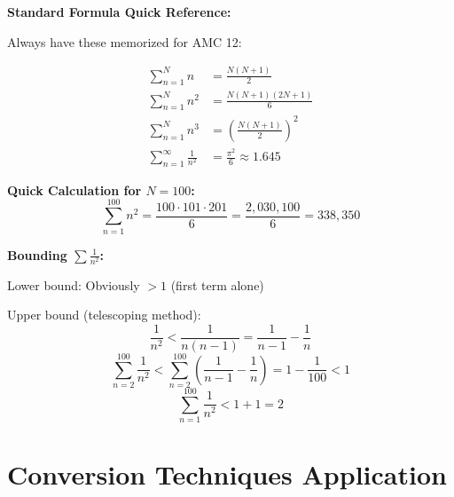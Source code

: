 \documentclass[12pt]{article}
\begin{document}
\begin{protip}
\textbf{Standard Formula Quick Reference:}

Always have these memorized for AMC 12:

\begin{align*}
\sum_{n=1}^{N} n &= \frac{N(N+1)}{2} \\
\sum_{n=1}^{N} n^2 &= \frac{N(N+1)(2N+1)}{6} \\
\sum_{n=1}^{N} n^3 &= \left(\frac{N(N+1)}{2}\right)^2 \\
\sum_{n=1}^{\infty} \frac{1}{n^2} &= \frac{\pi^2}{6} \approx 1.645
\end{align*}

\textbf{Quick Calculation for $N=100$:}
\[\sum_{n=1}^{100} n^2 = \frac{100 \cdot 101 \cdot 201}{6} = \frac{2{,}030{,}100}{6} = 338{,}350\]

\textbf{Bounding $\sum \frac{1}{n^2}$:}

Lower bound: Obviously $> 1$ (first term alone)

Upper bound (telescoping method):
\[\frac{1}{n^2} < \frac{1}{n(n-1)} = \frac{1}{n-1} - \frac{1}{n}\]
\[\sum_{n=2}^{100} \frac{1}{n^2} < \sum_{n=2}^{100} \left(\frac{1}{n-1} - \frac{1}{n}\right) = 1 - \frac{1}{100} < 1\]
\[\sum_{n=1}^{100} \frac{1}{n^2} < 1 + 1 = 2\]
\end{protip}

\section{Conversion Techniques Application}
\end{document}

